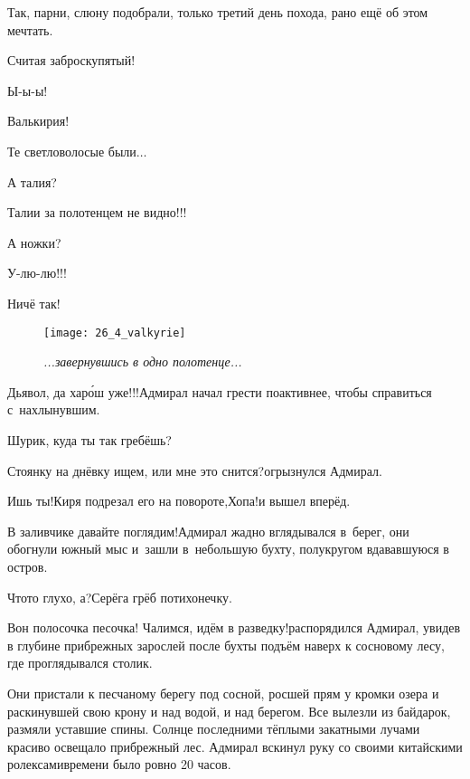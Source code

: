 \diagdash Так, парни, слюну подобрали, только третий день похода, рано ещё об этом мечтать.

\diagdash Считая заброску\mdash пятый!

\diagdash Ы-ы-ы!

\diagdash Валькирия!

\diagdash Те светловолосые были$\ldots$

\diagdash А талия?

\diagdash Талии за полотенцем не видно!!!

\diagdash А ножки?

\diagdash У-лю-лю!!!

\diagdash Ничё так!

\begin{wrapfigure}[22]{l}{0.6\textwidth}
	\centering
	\texttt{[image: 26\_4\_valkyrie]}
	\caption{\small\textit{...завернувшись в одно полотенце...}}
\end{wrapfigure}

\diagdash Дьявол, да хар{\'о}ш уже!!!\mdash Адмирал начал грести по\sdash активнее, чтобы справиться с~нахлынувшим.

\diagdash Шурик, куда ты так гребёшь?%

\diagdash Стоянку на днёвку ищем, или мне это снится?\mdash огрызнулся Адмирал.

\diagdash Ишь ты!\mdash Киря подрезал его на повороте,\mdash Хопа!\mdash и вышел вперёд.

\diagdash В заливчике давайте поглядим!\mdash Адмирал жадно вглядывался в~берег, они обогнули южный мыс и~зашли в~небольшую бухту, полукругом вдававшуюся в остров.

\diagdash Что\sdash то глухо, а?\mdash Серёга грёб потихонечку.

\diagdash Вон полосочка песочка! Чалимся, идём в разведку!\mdash распорядился Адмирал, увидев в глубине прибрежных зарослей после бухты подъём наверх к сосновому лесу, где проглядывался столик.

Они пристали к песчаному берегу под сосной, росшей прям у кромки озера и раскинувшей свою крону и над водой, и над берегом. Все вылезли из байдарок, размяли уставшие спины. Солнце последними тёплыми закатными лучами красиво освещало прибрежный лес. Адмирал вскинул руку со своими китайскими ролексами\mdash времени было ровно 20 часов.

